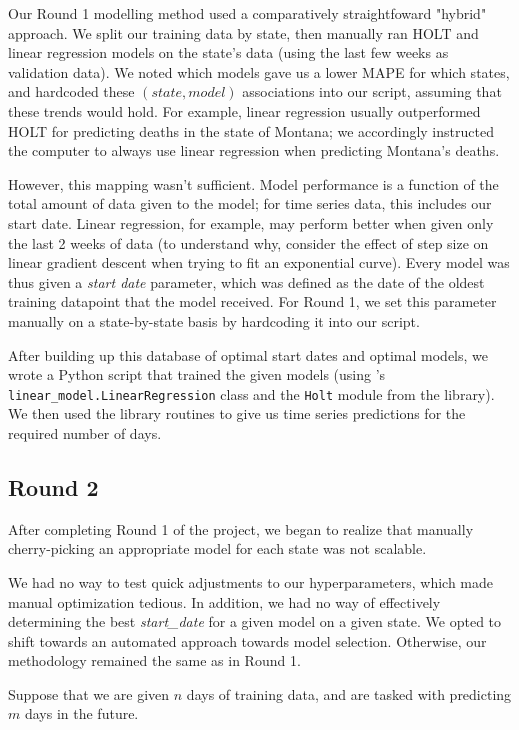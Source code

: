\documentclass[sigconf,nonacm]{acmart}
\begin{document}
Our Round 1 modelling method used a comparatively straightfoward "hybrid"
approach. We split our training data by state, then manually ran HOLT and
linear regression models on the state's data (using the last few weeks as
validation data). We noted which models gave us a lower MAPE for which states,
and hardcoded these $(state, model)$ associations into our script, assuming
that these trends would hold. For example, linear regression usually
outperformed HOLT for predicting deaths in the state of Montana; we accordingly
instructed the computer to always use linear regression when predicting
Montana's deaths. 

However, this mapping wasn't sufficient. 
Model performance is a function of the total amount of data given to the model;
for time series data, this includes our start date. Linear regression, for
example, may perform better when given only the last 2 weeks of data (to
understand why, consider the effect of step size on linear gradient descent
when trying to fit an exponential curve). 
Every model was thus given a \emph{start date} parameter, which was defined as
the date of the oldest training datapoint that the model received. 
For Round 1, we set this parameter manually on a state-by-state basis by
hardcoding it into our script. 

After building up this database of optimal start dates and optimal models, we
wrote a Python script that trained the given models (using \cite{scikit-learn}'s
\texttt{linear_model.LinearRegression} class and the \texttt{Holt} module from
the \cite{statsmodels} library). We then used the library routines to give us
time series predictions for the required number of days. 


\subsection{Round 2}


After completing Round 1 of the project, we began to realize that manually
cherry-picking an appropriate model for each state was not scalable. 

We had no way to test quick adjustments to our hyperparameters, which made
manual optimization tedious. In addition, we had no way of effectively
determining the best \emph{start_date} for a given model on a given state. 
We opted to shift towards an automated approach towards model selection. 
Otherwise, our methodology remained the same as in Round 1. 

Suppose that we are given $n$ days of training data, and are tasked with
predicting $m$ days in the future. 
\end{document}
